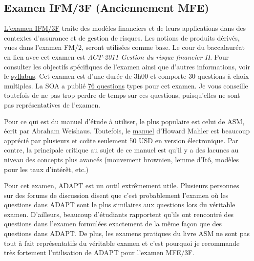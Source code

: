 \newpage
\subsection*{Examen IFM/3F (Anciennement MFE)}
\label{subsec:exammfe}
\href{https://www.soa.org/education/exam-req/edu-exam-mfe-detail.aspx}{L'examen IFM/3F} traite des modèles financiers et de leurs applications dans des contextes d'assurance et de gestion de risques. Les notions de produits dérivés, vues dans l'examen FM/2, seront utilisées comme base. Le cour du baccalauréat en lien avec cet examen est \textit{ACT-2011 Gestion du risque financier II}. Pour consulter les objectifs spécifiques de l'examen ainsi que d'autres informations, voir le \href{https://www.soa.org/Files/Edu/2016/edu-2016-11-mfe-syllabus.pdf}{syllabus}. Cet examen est d'une durée de 3h00 et comporte 30 questions à choix multiples. La SOA a publié \href{http://www.soa.org/files/edu/edu-exam-mfe-sample-quest-sol.pdf}{76 questions} types pour cet examen. Je vous conseille toutefois de ne pas trop perdre de temps sur ces questions, puisqu'elles ne sont pas représentatives de l'examen.\vspace{\baselineskip}

Pour ce qui est du manuel d'étude à utiliser, le plus populaire est celui de ASM, écrit par Abraham Weishaus. Toutefois, le \href{http://howardmahler.com/Teaching/MFE.html}{manuel} d'Howard Mahler est beaucoup apprécié par plusieurs et coûte seulement 50 USD en version électronique. Par contre, la principale critique au sujet de ce manuel est qu'il y a des lacunes au niveau des concepts plus avancés (mouvement brownien, lemme d'Itô, modèles pour les taux d'intérêt, etc.)\vspace{\baselineskip}

Pour cet examen, ADAPT est un outil extrêmement utile. Plusieurs personnes sur des forums de discussion disent que c'est probablement l'examen où les questions dans ADAPT sont le plus similaires aux questions lors du véritable examen. D'ailleurs, beaucoup d'étudiants rapportent qu'ils ont rencontré des questions dans l'examen formulées exactement de la même façon que des questions dans ADAPT. De plus, les examens pratiques du livre ASM ne sont pas tout à fait représentatifs du véritable examen et c'est pourquoi je recommande très fortement l'utilisation de ADAPT pour l'examen MFE/3F.\vspace{\baselineskip}

\newpage

